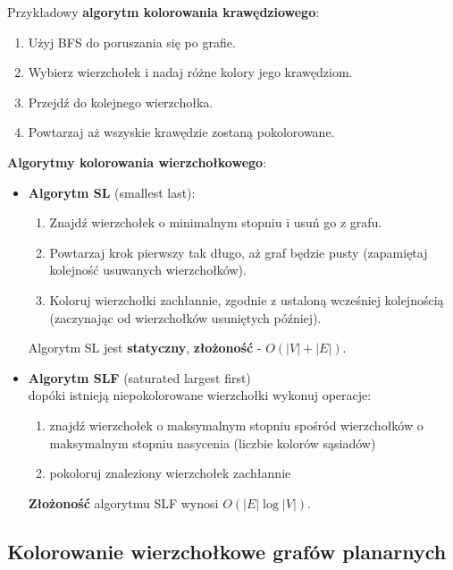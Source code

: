 \documentclass[main.tex]{subfiles}
\begin{document}
    \noindent Przykładowy \textbf{algorytm kolorowania krawędziowego}:
    \begin{enumerate}[noitemsep]
        \item Użyj BFS do poruszania się po grafie.
        \item Wybierz wierzchołek i nadaj różne kolory jego krawędziom.
        \item Przejdź do kolejnego wierzchołka.
        \item Powtarzaj aż wszyskie krawędzie zostaną pokolorowane.
    \end{enumerate}

    \noindent \textbf{Algorytmy kolorowania wierzchołkowego}:
    \begin{itemize}
        \item \textbf{Algorytm SL} (smallest last):
        \begin{enumerate}[noitemsep]
            \item Znajdź wierzchołek o minimalnym stopniu i usuń go z grafu.
            \item Powtarzaj krok pierwszy tak długo, aż graf będzie pusty (zapamiętaj kolejność usuwanych wierzchołków).
            \item Koloruj wierzchołki zachłannie, zgodnie z ustaloną wcześniej kolejnością (zaczynając od wierzchołków usuniętych później).
        \end{enumerate}
        Algorytm SL jest \textbf{statyczny}, \textbf{złożoność} - $O(|V|+|E|)$.

        \item \textbf{Algorytm SLF} (saturated largest first)\\
        dopóki istnieją niepokolorowane wierzchołki wykonuj operacje:
        \begin{enumerate}[noitemsep]
            \item znajdź wierzchołek o maksymalnym stopniu spośród wierzchołków o maksymalnym stopniu nasycenia
            (liczbie kolorów sąsiadów)
            \item pokoloruj znaleziony wierzchołek zachłannie
        \end{enumerate}
        \textbf{Złożoność} algorytmu SLF wynosi $O(|E|\log |V|)$.
    \end{itemize}


    \subsection{Kolorowanie wierzchołkowe grafów planarnych}
\end{document}
